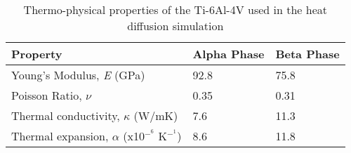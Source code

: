 \documentclass[report.tex]{subfiles}
\begin{document}
\begin{center}
  \begin{table}[h!]
  \caption{\label{tab:Ti64Properties}Thermo-physical properties of the Ti-6Al-4V used in the heat diffusion simulation}
  \begin{center}
  \begin{tabular}{|p{6cm}|p{3cm}|p{3cm}|}
  \hline
  \textbf{Property} &\textbf{Alpha Phase} &\textbf{Beta Phase}\\
  \hline
  Young's Modulus, \textit{E} (GPa) & 92.8 & 75.8 \\
   \hline
   Poisson Ratio, $\nu$ & 0.35 & 0.31 \\
   \hline
   Thermal conductivity, $\kappa$ (W/mK) & 7.6 & 11.3 \\
   \hline
   Thermal expansion, $\alpha$ (x10$^-^6$ K$^-^1$) & 8.6 & 11.8 \\
   \hline  
  \end{tabular}
  \end{center}
  \end{table}
\end{center}
\end{document}
